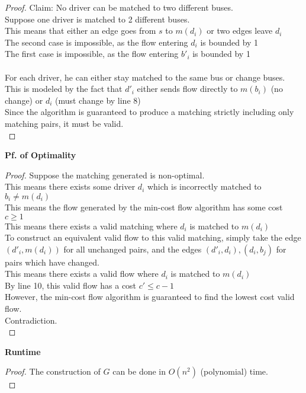 \begin{problem}
\begin{proof}
        Claim: No driver can be matched to two different buses. \\
        Suppose one driver is matched to 2 different buses. \\
        This means that either an edge goes from $s$ to $m(d_i)$ or two edges leave $d_i$ \\
        The second case is impossible, as the flow entering $d_i$ is bounded by 1 \\
        The first case is impossible, as the flow entering $b'_i$ is bounded by 1 \\\\
        For each driver, he can either stay matched to the same bus or change buses. \\
        This is modeled by the fact that $d'_i$ either sends flow directly to $m(b_i)$ (no change) or $d_i$ (must change by line 8) \\
        Since the algorithm is guaranteed to produce a matching strictly including only matching pairs, it must be valid. \\
    \end{proof}
    \noindent
    \textbf{Pf. of Optimality}
    \begin{proof}
        Suppose the matching generated is non-optimal. \\
        This means there exists some driver $d_i$ which is incorrectly matched to $b_i \neq m(d_i)$ \\
        This means the flow generated by the min-cost flow algorithm has some cost $c \geq 1$ \\
        This means there exists a valid matching where $d_i$ is matched to $m(d_i)$ \\
        To construct an equivalent valid flow to this valid matching, simply take the edge $(d'_i, m(d_i))$ for all unchanged pairs,
        and the edges $(d'_i, d_i), (d_i, b_j)$ for pairs which have changed. \\
        This means there exists a valid flow where $d_i$ is matched to $m(d_i)$ \\
        By line 10, this valid flow has a cost $c' \leq c - 1$ \\
        However, the min-cost flow algorithm is guaranteed to find the lowest cost valid flow. \\
        Contradiction. \\
    \end{proof}
    \textbf{Runtime}
    \begin{proof}
        The construction of $G$ can be done in $O(n^2)$ (polynomial) time. \\

\end{proof}
\end{problem}
